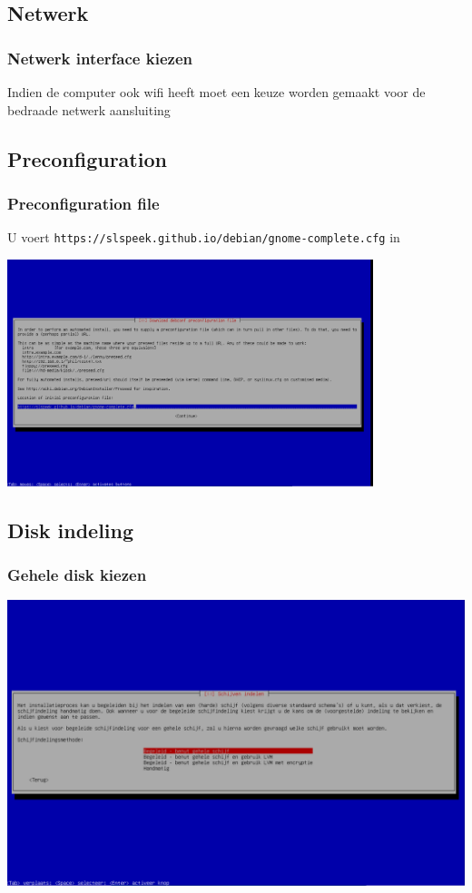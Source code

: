 \documentclass{beamer}
\begin{document}
\subsection{Netwerk}

\begin{frame}
   \frametitle{Netwerk interface kiezen}
   Indien de computer ook wifi heeft moet een keuze worden gemaakt voor de bedraade netwerk aansluiting
\end{frame}

\subsection{Preconfiguration}

\begin{frame}
   \frametitle{Preconfiguration file}
   U voert \texttt{https://slspeek.github.io/debian/gnome-complete.cfg} in
   
   \centering
   \includegraphics[width=0.8\textwidth]{img/preseed-adres.png}
\end{frame}

\subsection{Disk indeling}
\begin{frame}
   \frametitle{Gehele disk kiezen}
   
   \centering
   \includegraphics[width=\textwidth]{img/gehele-disk-kiezen.png}
\end{frame}

\end{document}
